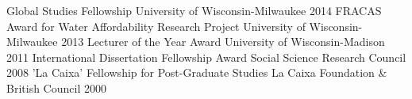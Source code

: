 \begin{cvhonors}
  \cvhonor
    {Global Studies Fellowship}
    {University of Wisconsin-Milwaukee}
    {}
    {2014}
  \cvhonor
    {FRACAS Award for Water Affordability Research Project}
    {University of Wisconsin-Milwaukee}
    {}
    {2013}
  \cvhonor
    {Lecturer of the Year Award}
    {University of Wisconsin-Madison}
    {}
    {2011}
  \cvhonor
    {International Dissertation Fellowship Award}
    {Social Science Research Council}
    {}
    {2008}
  \cvhonor
    {'La Caixa' Fellowship for Post-Graduate Studies}
    {La Caixa Foundation \& British Council}
    {}
    {2000}
\end{cvhonors}
